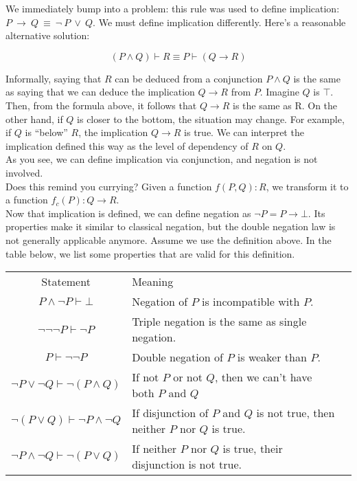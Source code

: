 \documentclass[10pt]{asme2ej}
\begin{document}
We immediately bump into a problem: this rule was used to define
implication: $P\ \rightarrow\ Q\ \equiv\ \neg\ P\ \lor\ Q$. 
We must define implication differently. Here's a reasonable alternative solution:

$$(P \land Q)\vdash R \equiv P \vdash ( Q \rightarrow R)$$

Informally, saying that $R$ can be deduced from a conjunction $P\land Q$
is the same as saying that we can deduce the implication $Q\rightarrow R$ from $P$. 
Imagine $Q$ is $\top$. Then, from the formula
above, it follows that $Q\rightarrow R$ is the same as R. On the other hand,
if $Q$ is closer to the bottom, the situation may change. 
For example, if $Q$ is “below” $R$, the implication $Q\rightarrow R$ is true.
We can interpret the implication defined this way as the level of dependency of $R$ on $Q$.\\

As you see, we can define implication via conjunction, and negation is not involved.\\

Does this remind you currying? Given a function $f(P,Q):R$, we
transform it to a function $f_c(P): Q \rightarrow R$.\\

Now that implication is defined, we can define negation as
$\neg P = P\rightarrow \bot$. Its properties make it
similar to classical negation, but the double negation law is not generally applicable anymore. Assume we use the definition above. 
In the table below, we list some properties that are valid for this definition.
\FloatBarrier
\begin{table}[!htbp]
\begin{center}
\label{table_Sample_Statements}
\begin{tabular}{c l l}
& & \\ 
\hline
Statement & Meaning \\
\hline
$P \land \neg P \vdash \bot$ & Negation of $P$ is incompatible with $P$.\\
  $\neg \neg \neg P \vdash \neg P$ & Triple negation is the same as single negation.\\
  $P \vdash \neg \neg P$ & Double negation of $P$ is weaker than $P$.\\
  $\neg P \lor \neg Q \vdash \neg (P \land Q)$ &  If not $P$ or not $Q$, then we can’t have both $P$ and $Q$\\
  $\neg (P \lor Q) \vdash \neg P \land \neg Q$ &  If disjunction of $P$ and $Q$ is not true, then neither $P$ nor $Q$ is true.\\
  $\neg P \land \neg Q \vdash \neg (P \lor Q)$ & If neither $P$ nor $Q$ is true, their disjunction is not true.\\
\hline
\end{tabular}
\end{center}
\end{table}
\end{document}
